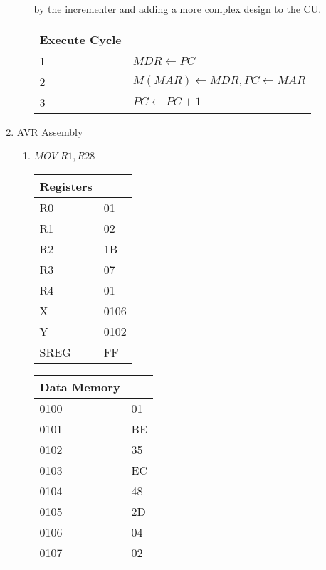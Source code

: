 \documentclass[12pt,letterpaper]{article}
\begin{document}
\begin{enumerate}
\begin{enumerate}
        by the incrementer and adding a more complex design to the CU.\\
        \begin{tabular}{l l}
        Execute Cycle\\
        \hline
            1 & $MDR \leftarrow PC$\\
            2 & $M(MAR) \leftarrow MDR, PC \leftarrow MAR$\\
            3 & $PC \leftarrow PC+1$\\
        \end{tabular}
    \end{enumerate}
    \item AVR Assembly\\
    \bigskip
    \begin{enumerate}[i]
    \item $MOV$  $R1,R28$\\
        \begin{tabular}{l l}
            Registers & \\
            \hline
            R0   & 01 \\
            R1   & 02 \\
            R2   & 1B \\
            R3   & 07 \\
            R4   & 01 \\
            X    & 0106 \\
            Y    & 0102 \\
            SREG & FF \\
        \end{tabular}
        \begin{tabular}{l l}
            Data Memory & \\
            \hline
            0100 & 01 \\
            0101 & BE \\
            0102 & 35 \\
            0103 & EC \\
            0104 & 48 \\
            0105 & 2D \\
            0106 & 04 \\
            0107 & 02 \\
        \end{tabular}


\end{enumerate}
\end{enumerate}
\end{document}
